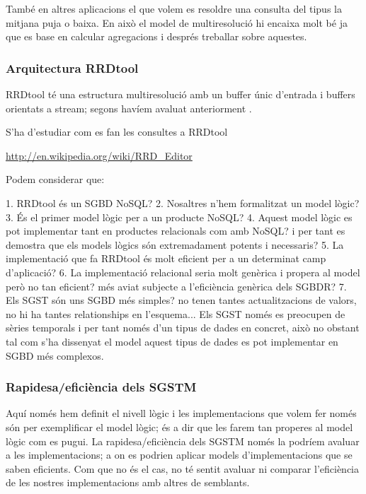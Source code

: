 També en altres aplicacions el que volem es resoldre una consulta del tipus la mitjana puja o baixa. En això el model de multiresolució hi encaixa molt bé ja que es base en calcular agregacions i després treballar sobre aquestes. 



\subsubsection{Arquitectura RRDtool}


RRDtool té una estructura multiresolució amb un buffer únic d'entrada
i buffers orientats a stream; segons havíem avaluat anteriorment \parencite{llusa11:tfm}.


S'ha d'estudiar com es fan les consultes a RRDtool

\url{http://en.wikipedia.org/wiki/RRD_Editor}



Podem considerar que:

1. RRDtool és un SGBD NoSQL?
2. Nosaltres n'hem formalitzat un model lògic?
3. És el primer model lògic per a un producte NoSQL?
4. Aquest model lògic es pot implementar tant en productes relacionals com amb NoSQL? i per tant es demostra que els models lògics són extremadament potents i necessaris?
5. La implementació que fa RRDtool és molt eficient per a un determinat camp d'aplicació?
6. La implementació relacional seria molt genèrica i propera al model però no tan eficient? més aviat subjecte a l'eficiència genèrica dels SGBDR?
7. Els SGST són uns SGBD més simples? no tenen tantes actualitzacions de valors, no hi ha tantes relationships en l'esquema... Els SGST només es preocupen de sèries temporals i per tant només d'un tipus de dades en concret, això no obstant tal com s'ha dissenyat el model aquest tipus de dades es pot implementar en SGBD més complexos. 


\subsubsection{Rapidesa/eficiència dels SGSTM}

Aquí només hem definit el nivell lògic i les implementacions que volem
fer només són per exemplificar el model lògic; és a dir que les farem
tan properes al model lògic com es pugui. La rapidesa/eficiència dels
SGSTM només la podríem avaluar a les implementacions; a on es podrien
aplicar models d'implementacions que se saben eficients. Com que no és
el cas, no té sentit avaluar ni comparar l'eficiència de les nostres
implementacions amb altres de semblants.




